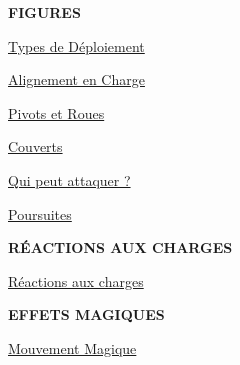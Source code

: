 
\setlength\columnseprule{0.5pt}
\hypertarget{toc}{\tableofcontents}
\thispagestyle{empty}
\setlength\columnseprule{0pt}

\newpage

\thispagestyle{empty}
\begin{center}\end{center}
\vspace*{10pt}

\begin{framed}
\vspace*{-10pt}
\setlength\columnseprule{0.5pt}
\begin{multicols}{3}\raggedcolumns
\begin{center}\textbf{FIGURES}\end{center}

\vspace*{5pt}
{\setlength\parskip{0pt}
\hyperlink{deploymenttypefigure}{Types de Déploiement}\hfill\pageref{figure/deployment}

\hyperlink{chargealignmentfigure}{Alignement en Charge}\hfill\pageref{figure/chargealignment}

\hyperlink{pivotsandwheelsfigure}{Pivots et Roues}\hfill\pageref{figure/wheels}

\hyperlink{coverfigures}{Couverts}\hfill\pageref{figure/soft_cover}

\hyperlink{whocanstrikefigure}{Qui peut attaquer ?}\hfill\pageref{figure/empty_gaps}

\hyperlink{pursuitsfigure}{Poursuites}\hfill\pageref{figure/pursuit}

\hyperlink{frontrankfigure}{\frontrank{}}\hfill\pageref{figure/front_rank}

\hyperlink{skirmishersfigure}{\skirmishers{}}\hfill\pageref{figure/skirmishers}}

\vspace*{5pt}
\begin{center}\textbf{RÉACTIONS AUX CHARGES}\end{center}

\vspace*{5pt}
{\setlength\parskip{0pt}
\hyperlink{chargereaction}{Réactions aux charges}\hfill\pageref{chargereaction}}

\vspace*{5pt}
\begin{center}\textbf{EFFETS MAGIQUES}\end{center}

\vspace*{5pt}
{\setlength\parskip{0pt}
\hyperlink{magicalmove}{Mouvement Magique}\hfill\pageref{magicalmove}

}
\end{multicols}
\end{framed}
